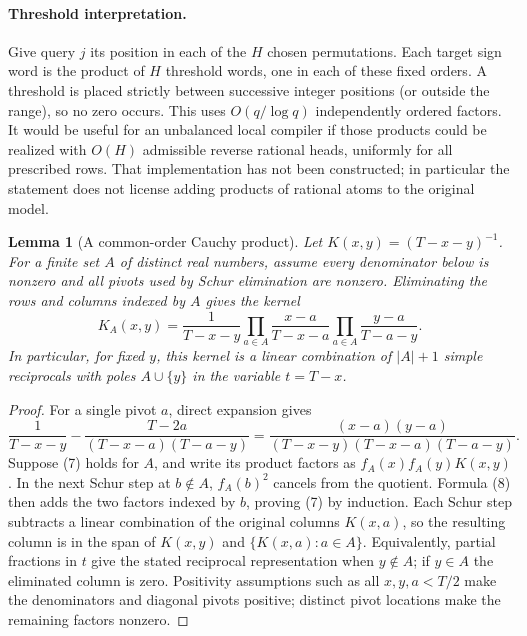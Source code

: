 \documentclass[11pt]{article}
\newtheorem{lemma}{Lemma}
\begin{document}
\paragraph{Threshold interpretation.}
Give query $j$ its position in each of the $H$ chosen permutations.
Each target sign word is the product of $H$ threshold words, one in
each of these fixed orders. A threshold is placed strictly between
successive integer positions (or outside the range), so no zero
occurs. This uses $O(q/\log q)$ independently ordered factors. It
would be useful for an unbalanced local compiler if those products
could be realized with $O(H)$ admissible reverse rational heads,
uniformly for all prescribed rows. That implementation has not been
constructed; in particular the statement does not license adding
products of rational atoms to the original model.

\begin{lemma}[A common-order Cauchy product]
Let $K(x,y)=(T-x-y)^{-1}$. For a finite set $A$ of distinct real
numbers, assume every denominator below is nonzero and all pivots
used by Schur elimination are nonzero. Eliminating the rows and
columns indexed by $A$ gives the kernel
\[
 K_A(x,y)=\frac1{T-x-y}
  \prod_{a\in A}\frac{x-a}{T-x-a}
  \prod_{a\in A}\frac{y-a}{T-a-y}. \tag{7}
\]
In particular, for fixed $y$, this kernel is a linear combination
of $|A|+1$ simple reciprocals with poles $A\cup\{y\}$ in the
variable $t=T-x$.
\end{lemma}

\begin{proof}
For a single pivot $a$, direct expansion gives
\[
 \frac1{T-x-y}-\frac{T-2a}{(T-x-a)(T-a-y)}
 =\frac{(x-a)(y-a)}{(T-x-y)(T-x-a)(T-a-y)}. \tag{8}
\]
Suppose (7) holds for $A$, and write its product factors as
$f_A(x)f_A(y)K(x,y)$. In the next Schur step at $b\notin A$,
$f_A(b)^2$ cancels from the quotient. Formula (8) then adds the two
factors indexed by $b$, proving (7) by induction. Each Schur step
subtracts a linear combination of the original columns $K(x,a)$,
so the resulting column is in the span of $K(x,y)$ and
$\{K(x,a):a\in A\}$. Equivalently, partial fractions in $t$ give
the stated reciprocal representation when $y\notin A$; if $y\in A$
the eliminated column is zero. Positivity assumptions such as all
$x,y,a<T/2$ make the denominators and diagonal pivots positive;
distinct pivot locations make the remaining factors nonzero.
\end{proof}
\end{document}
